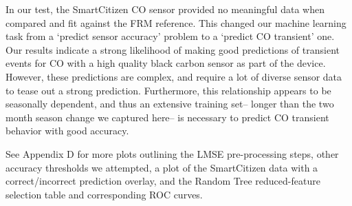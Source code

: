 In our test, the SmartCitizen CO sensor provided no meaningful data when compared and fit against the FRM reference.  This changed our machine learning task from a `predict sensor accuracy' problem to a `predict CO transient' one.  Our results indicate a strong likelihood of making good predictions of transient events for CO with a high quality black carbon sensor as part of the device.  However, these predictions are complex, and require a lot of diverse sensor data to tease out a strong prediction.  Furthermore, this relationship appears to be seasonally dependent, and thus an extensive training set-- longer than the two month season change we captured here-- is necessary to predict CO transient behavior with good accuracy.

See Appendix D for more plots outlining the LMSE pre-processing steps, other accuracy thresholds we attempted, a plot of the SmartCitizen data with a correct/incorrect prediction overlay, and the Random Tree reduced-feature selection table and corresponding ROC curves. 


